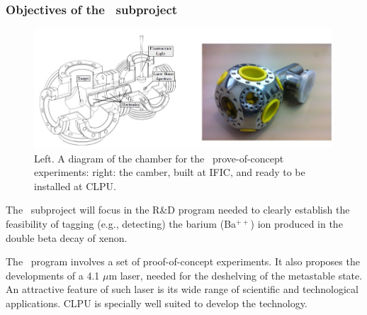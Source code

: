 %

\subsubsection*{Objectives of the \BATA\ subproject}

\begin{figure}
\begin{center}
\includegraphics[width=0.99\textwidth]{img/BChamber.jpg}
\caption{\small Left. A diagram of the chamber for the \BATA\ prove-of-concept experiments: right: the camber, built at IFIC, and ready to be installed at CLPU.}
\label{fig:chamber}
\end{center}
\end{figure}

The \BATA\ subproject will focus in the R\&D program needed to clearly establish the feasibility of tagging (e.g., detecting) the barium (Ba$^{++}$) ion produced in the double beta decay of xenon. 

The \BATA\ program involves a set of proof-of-concept experiments. It also proposes the developments of a 4.1 $\mu$m laser, needed for the deshelving of the metastable state. An attractive feature of such laser is its wide range of scientific and technological applications. CLPU is specially well suited to develop the technology.

